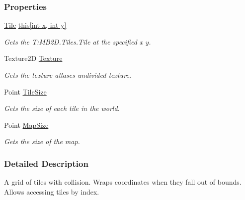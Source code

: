 \subsubsection*{Properties}
\begin{DoxyCompactItemize}
\item 
\hyperlink{class_m_b2_d_1_1_tile}{Tile} \hyperlink{class_m_b2_d_1_1_tiles_1_1_tile_map_a1d25bbc810a7a2664d09d734aada5490}{this\mbox{[}int x, int y\mbox{]}}
\begin{DoxyCompactList}\small\item\em Gets the T\+:\+M\+B2\+D.\+Tiles.\+Tile at the specified x y. \end{DoxyCompactList}\item 
Texture2D \hyperlink{class_m_b2_d_1_1_tiles_1_1_tile_map_a0f5a6cdcd141ab461f7b8bf316e71a9f}{Texture}
\begin{DoxyCompactList}\small\item\em Gets the texture atlases undivided texture. \end{DoxyCompactList}\item 
Point \hyperlink{class_m_b2_d_1_1_tiles_1_1_tile_map_a8bdd9b00d7aaba26f9078d3f32438169}{Tile\+Size}
\begin{DoxyCompactList}\small\item\em Gets the size of each tile in the world. \end{DoxyCompactList}\item 
Point \hyperlink{class_m_b2_d_1_1_tiles_1_1_tile_map_a1132945901a5228f1e58d38945b13eeb}{Map\+Size}
\begin{DoxyCompactList}\small\item\em Gets the size of the map. \end{DoxyCompactList}\end{DoxyCompactItemize}


\subsubsection{Detailed Description}
A grid of tiles with collision. Wraps coordinates when they fall out of bounds. Allows accessing tiles by index. 



